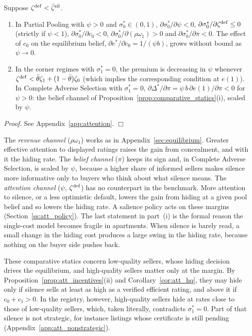 \begin{proposition}
\label{prop:att_cs}
Suppose $\zeta^{\rm def}<\bar \zeta^{\rm sil}$.
\begin{enumerate}[label=(\roman*)]
    \item In Partial Pooling with $\psi>0$ and $\sigma_0^*\in(0,1)$, $\partial\sigma_0^*/\partial\psi<0$, $\partial\sigma_0^*/\partial \zeta^{\rm def}\le0$ (strictly if $\psi<1$), $\partial\sigma_0^*/\partial c_0<0$, $\partial\sigma_0^*/\partial(\rho\omega_1)>0$ and $\partial\sigma_0^*/\partial\pi<0$. The effect of $c_0$ on the equilibrium belief, $\partial e^*/\partial c_0=1/(\psi b)$, grows without bound as $\psi\to0$.
    \item In the corner regimes with $\sigma_1^*=0$, the premium is decreasing in $\psi$ whenever $\zeta^{\rm def}<\bar\theta \zeta_1+(1-\bar\theta)\zeta_0$ (which implies the corresponding condition at $e(1)$). In Complete Adverse Selection with $\sigma_1^*=0$, $\partial\Delta^*/\partial\pi=\psi\,b\,\partial e(1)/\partial\pi<0$ for $\psi>0$: the belief channel of Proposition~\ref{prop:comparative_statics}(i), scaled by $\psi$.
\end{enumerate}
\end{proposition}

\noindent\textit{Proof.} See Appendix~\ref{app:attention}. $\Box$

The \emph{revenue channel} ($\rho\omega_1$) works as in Appendix~\ref{sec:equilibrium}. Greater effective attention to displayed ratings raises the gain from concealment, and with it the hiding rate. The \emph{belief channel} ($\pi$) keeps its sign and, in Complete Adverse Selection, is scaled by $\psi$, because a higher share of informed sellers makes silence more informative only to buyers who think about what silence means. The \emph{attention channel} ($\psi$, $\zeta^{\rm def}$) has no counterpart in the benchmark. More attention to silence, or a less optimistic default, lowers the gain from hiding at a given pool belief and so lowers the hiding rate. A salience policy acts on these margins (Section~\ref{ss:att_policy}). The last statement in part~(i) is the formal reason the single-cost model becomes fragile in apartments. When silence is barely read, a small change in the hiding cost produces a large swing in the hiding rate, because nothing on the buyer side pushes back.

These comparative statics concern low-quality sellers, whose hiding decision drives the equilibrium, and high-quality sellers matter only at the margin. By Proposition~\ref{prop:att_incentives}(ii) and Corollary~\ref{cor:att_hq}, they may hide only if silence sells at least as high as a verified efficient rating, and above it if $c_0+c_1>0$. In the registry, however, high-quality sellers hide at rates close to those of low-quality sellers, which, taken literally, contradicts $\sigma_1^*=0$. Part of that silence is not strategic, for instance listings whose certificate is still pending (Appendix~\ref{app:att_nonstrategic}).

